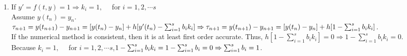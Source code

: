 \documentclass[10pt]{article}
\begin{document}
\begin{enumerate}[label=\bf{Problem \arabic*}.]
\begin{enumerate}
\begin{enumerate}
            Second order Taylor expanding around the point $(t_n,y_n)$, we obtain\\
            $f(t_n+h,y_n+hf(t_n,y_n))\\
            =f+h(f_t+ff_y)+\frac{h^2}{2}(f_{tt}(\xi,\eta)+2ff_{ty}(\xi,\eta)+f^2f_{ty}(\xi,\eta))$
            \item Assume $y(t_n)=y_n$. $\tau_{n+1}=y(t_{n+1})-y_{n+1}$.
            Taylor expand $y(t_{n+1})=y(t_n)+hy'(t_n)+\frac{h^2}{2}y''(t_n)+\frac{h^3}{6}y'''(\xi')$\\
            Using $(i)$,\\ $y_{n+1}=y_n+\frac{h}{2}(2f+h(f_t+ff_y)+\frac{h^2}{2}(f_{tt}(\xi,\eta)+2ff_{ty}(\xi,\eta)+f^2f_{ty}(\xi,\eta)))\\
            =y_n+hf+\frac{h^2}{2}(f_t+ff_y)+\frac{h^3}{4}(f_{tt}(\xi,\eta)+2ff_{ty}(\xi,\eta)+f^2f_{ty}(\xi,\eta))$\\
            Thus, $y(t_{n+1})-y_{n+1}
            =[y(t_n)-t_n]
            +h[y'(t_n)-f]\\
            +\frac{h^2}{2}[y''(t_n)-f_t+ff_y]\\
            +[\frac{h^3}{6}y'''(\xi')-\frac{h^3}{4}(f_{tt}(\xi,\eta)+2ff_{ty}(\xi,\eta)+f^2f_{ty}(\xi,\eta))]$\\
            We know $y'(t)=f(t,y(t))$ and $y''(t)=f_t+ff_y$ and assume $y(t_n)=y_n$\\ 
            Hence, $y(t_{n+1})-y_{n+1}=[\frac{h^3}{6}y'''(\xi')-\frac{h^3}{4}(f_{tt}(\xi,\eta)+2ff_{ty}(\xi,\eta)+f^2f_{ty}(\xi,\eta))]=O(h^3)$, so $\tau_{n+1}$ is second order accurate.
        \end{enumerate}    
    \end{enumerate}
    \item If $y'=f(t,y)=1\Rightarrow k_i=1,\quad$ for $i=1,2,\cdots s$\\
    Assume $y(t_n)=y_n$.\\
    $\tau_{n+1}=y(t_{n+1})-y_{n+1}=[y(t_n)-y_n]+h[y'(t_n)-\sum_{i=1}^{s} b_i k_i]\\
    \Rightarrow \tau_{n+1}=y(t_{n+1})-y_{n+1}=[y(t_n)-y_n]+h[1-\sum_{i=1}^{s} b_i k_i]$.\\
    If the numerical method is consistent, then it is at least first order accurate.
    Thus, $h[1-\sum_{i=1}^{s} b_i k_i]=0\Rightarrow 1-\sum_{i=1}^{s} b_i k_i=0$.\\
    Because $k_i=1,\quad$ for $i=1,2,\cdots s$,$1-\sum_{i=1}^{s} b_i k_i=1-\sum_{i=1}^{s} b_i=0\\
    \Rightarrow \sum_{i=1}^{s} b_i=1$.\\

\end{enumerate}
\end{document}

